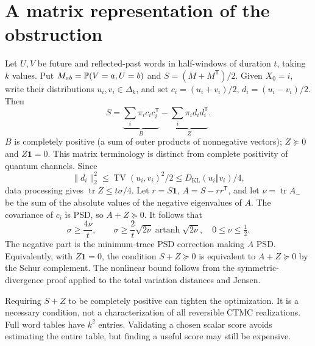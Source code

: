 \documentclass[11pt,a4paper]{article}
\newcommand{\one}{\mathbf 1}\newcommand{\KL}{D_{\mathrm{KL}}}
\newcommand{\TV}{\operatorname{TV}}\newcommand{\atanh}{\operatorname{artanh}}
\newcommand{\tr}{\operatorname{tr}}
\begin{document}
\section{A matrix representation of the obstruction}
Let $U,V$ be future and reflected-past words in half-windows of duration $t$, taking $k$ values. Put $M_{ab}=\mathbb P(V=a,U=b)$ and $S=(M+M^{\mathsf T})/2$. Given $X_0=i$, write their distributions $u_i,v_i\in\Delta_k$, and set $c_i=(u_i+v_i)/2$, $d_i=(u_i-v_i)/2$. Then
\begin{equation}\label{eq:matrix}
S=\underbrace{\sum_i\pi_i c_ic_i^{\mathsf T}}_{B}
-\underbrace{\sum_i\pi_i d_id_i^{\mathsf T}}_{Z}.
\end{equation}
$B$ is completely positive (a sum of outer products of nonnegative vectors); $Z\succeq0$ and $Z\one=0$. This matrix terminology is distinct from complete positivity of quantum channels. Since
\[
\|d_i\|_2^2\leq\TV(u_i,v_i)^2/2\leq\KL(u_i\Vert v_i)/4,
\]
data processing gives $\tr Z\leq t\sigma/4$. Let $r=S\one$, $A=S-rr^{\mathsf T}$, and let $\nu=\tr A_-$ be the sum of the absolute values of the negative eigenvalues of $A$. The covariance of $c_i$ is PSD, so $A+Z\succeq0$. It follows that
\[
\boxed{\displaystyle\sigma\geq\frac{4\nu}{t}},\qquad
\sigma\geq\frac2t\sqrt{2\nu}\atanh\sqrt{2\nu},\quad0\leq\nu\leq\tfrac12.
\]
The negative part is the minimum-trace PSD correction making $A$ PSD. Equivalently, with $Z\one=0$, the condition $S+Z\succeq0$ is equivalent to $A+Z\succeq0$ by the Schur complement. The nonlinear bound follows from the symmetric-divergence proof applied to the total variation distances and Jensen.

Requiring $S+Z$ to be completely positive can tighten the optimization. It is a necessary condition, not a characterization of all reversible CTMC realizations. Full word tables have $k^2$ entries. Validating a chosen scalar score avoids estimating the entire table, but finding a useful score may still be expensive.
\end{document}

